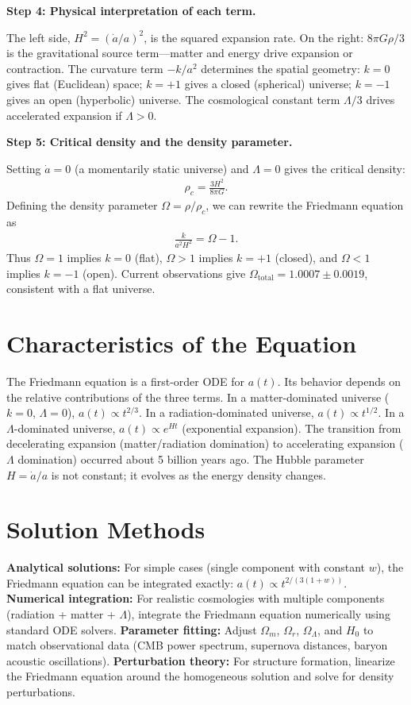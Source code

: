 \documentclass[11pt,openright]{book}
\begin{document}
\textbf{Step 4: Physical interpretation of each term.}

The left side, $H^2 = (\dot{a}/a)^2$, is the squared expansion rate. On the right: $8\pi G\rho/3$ is the gravitational source term---matter and energy drive expansion or contraction. The curvature term $-k/a^2$ determines the spatial geometry: $k = 0$ gives flat (Euclidean) space; $k = +1$ gives a closed (spherical) universe; $k = -1$ gives an open (hyperbolic) universe. The cosmological constant term $\Lambda/3$ drives accelerated expansion if $\Lambda > 0$.

\textbf{Step 5: Critical density and the density parameter.}

Setting $\dot{a} = 0$ (a momentarily static universe) and $\Lambda = 0$ gives the critical density:
\begin{align}
\rho_c = \frac{3H^2}{8\pi G}.
\end{align}
Defining the density parameter $\Omega = \rho/\rho_c$, we can rewrite the Friedmann equation as
\begin{align}
\frac{k}{a^2 H^2} = \Omega - 1.
\end{align}
Thus $\Omega = 1$ implies $k = 0$ (flat), $\Omega > 1$ implies $k = +1$ (closed), and $\Omega < 1$ implies $k = -1$ (open). Current observations give $\Omega_{\text{total}} = 1.0007 \pm 0.0019$, consistent with a flat universe.

\section*{Characteristics of the Equation}

The Friedmann equation is a first-order ODE for $a(t)$. Its behavior depends on the relative contributions of the three terms. In a matter-dominated universe ($k = 0$, $\Lambda = 0$), $a(t) \propto t^{2/3}$. In a radiation-dominated universe, $a(t) \propto t^{1/2}$. In a $\Lambda$-dominated universe, $a(t) \propto e^{Ht}$ (exponential expansion). The transition from decelerating expansion (matter/radiation domination) to accelerating expansion ($\Lambda$ domination) occurred about 5 billion years ago. The Hubble parameter $H = \dot{a}/a$ is not constant; it evolves as the energy density changes.
\section*{Solution Methods}

\textbf{Analytical solutions:} For simple cases (single component with constant $w$), the Friedmann equation can be integrated exactly: $a(t) \propto t^{2/(3(1+w))}$. \textbf{Numerical integration:} For realistic cosmologies with multiple components (radiation + matter + $\Lambda$), integrate the Friedmann equation numerically using standard ODE solvers. \textbf{Parameter fitting:} Adjust $\Omega_m$, $\Omega_r$, $\Omega_\Lambda$, and $H_0$ to match observational data (CMB power spectrum, supernova distances, baryon acoustic oscillations). \textbf{Perturbation theory:} For structure formation, linearize the Friedmann equation around the homogeneous solution and solve for density perturbations.
\end{document}
